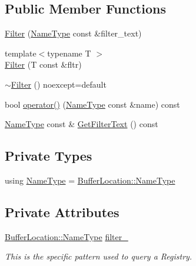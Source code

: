 \subsection*{Public Member Functions}
\begin{DoxyCompactItemize}
\item 
\hyperlink{classregistry_1_1Filter_a91fa4858a3facd5ae4f302426ec0c126}{Filter} (\hyperlink{classregistry_1_1Filter_adca74845d8a5adb325dea6fb17dbcb2e}{Name\+Type} const \&filter\+\_\+text)
\item 
{\footnotesize template$<$typename T $>$ }\\\hyperlink{classregistry_1_1Filter_adb0037080036d7a808776054719bfb8c}{Filter} (T const \&fltr)
\item 
\hyperlink{classregistry_1_1Filter_a46e0bdb0721240eb83204817659bc1c0}{$\sim$\+Filter} () noexcept=default
\item 
bool \hyperlink{classregistry_1_1Filter_a88b3490d87c58983a16acb2c5fba077e}{operator()} (\hyperlink{classregistry_1_1Filter_adca74845d8a5adb325dea6fb17dbcb2e}{Name\+Type} const \&name) const
\item 
\hyperlink{classregistry_1_1Filter_adca74845d8a5adb325dea6fb17dbcb2e}{Name\+Type} const  \& \hyperlink{classregistry_1_1Filter_ac0f7882d01e05fe52a3d71b548aabd50}{Get\+Filter\+Text} () const
\end{DoxyCompactItemize}
\subsection*{Private Types}
\begin{DoxyCompactItemize}
\item 
using \hyperlink{classregistry_1_1Filter_adca74845d8a5adb325dea6fb17dbcb2e}{Name\+Type} = \hyperlink{structregistry_1_1BufferLocation_ad3c2279012b74798fa1e348507020fa4}{Buffer\+Location\+::\+Name\+Type}
\end{DoxyCompactItemize}
\subsection*{Private Attributes}
\begin{DoxyCompactItemize}
\item 
\hyperlink{structregistry_1_1BufferLocation_ad3c2279012b74798fa1e348507020fa4}{Buffer\+Location\+::\+Name\+Type} \hyperlink{classregistry_1_1Filter_a36d1de00325358200ebe9edadc92f14f}{filter\+\_\+}
\begin{DoxyCompactList}\small\item\em This is the specific pattern used to query a Registry. \end{DoxyCompactList}\end{DoxyCompactItemize}
